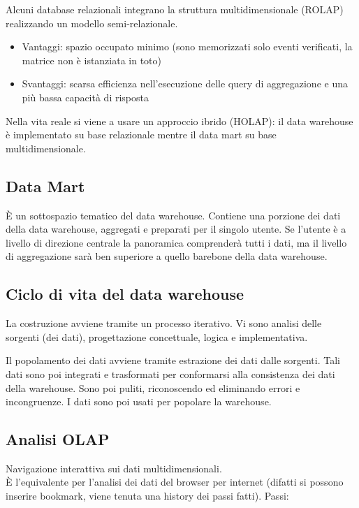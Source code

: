Alcuni database relazionali integrano la struttura multidimensionale (ROLAP)
realizzando un modello semi-relazionale.

\begin{itemize}

\item
  Vantaggi: spazio occupato minimo (sono memorizzati solo eventi
  verificati, la matrice non \`e istanziata in toto)
\item
  Svantaggi: scarsa efficienza nell'esecuzione delle query di
  aggregazione e una pi\`u bassa capacit\`a di risposta
\end{itemize}

Nella vita reale si viene a usare un approccio ibrido (HOLAP): il data
warehouse \`e implementato su base relazionale mentre il data mart su base
multidimensionale.

\subsection{Data Mart}\label{data-mart}

\`E un sottospazio tematico del data warehouse.
Contiene una porzione dei dati della data warehouse, aggregati e
preparati per il singolo utente. Se l'utente \`e a livello di direzione
centrale la panoramica comprender\`a tutti i dati, ma il livello di
aggregazione sar\`a ben superiore a quello barebone della data warehouse.

\subsection{Ciclo di vita del data warehouse}\label{ciclo-di-vita-del-data-warehouse}

La costruzione avviene tramite un processo iterativo. Vi sono analisi
delle sorgenti (dei dati), progettazione concettuale, logica e
implementativa.

Il popolamento dei dati avviene tramite estrazione dei dati dalle
sorgenti. Tali dati sono poi integrati e trasformati per conformarsi
alla consistenza dei dati della warehouse. Sono poi puliti, riconoscendo
ed eliminando errori e incongruenze. I dati sono poi usati per popolare
la warehouse.

\subsection{Analisi OLAP}\label{analisi-olap}

Navigazione interattiva sui dati multidimensionali.\\
\`E l'equivalente per l'analisi dei dati del browser per internet (difatti si possono inserire bookmark, viene tenuta una history dei passi fatti). Passi:

